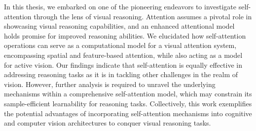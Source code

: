 In this thesis, we embarked on one of the pioneering endeavors to investigate self-attention through the lens of visual reasoning. Attention assumes a pivotal role in showcasing visual reasoning capabilities, and an enhanced attentional model holds promise for improved reasoning abilities. We elucidated how self-attention operations can serve as a computational model for a visual attention system, encompassing spatial and feature-based attention, while also acting as a model for active vision. Our findings indicate that self-attention is equally effective in addressing reasoning tasks as it is in tackling other challenges in the realm of vision. However, further analysis is required to unravel the underlying mechanisms within a comprehensive self-attention model, which may constrain its sample-efficient learnability for reasoning tasks. Collectively, this work exemplifies the potential advantages of incorporating self-attention mechanisms into cognitive and computer vision architectures to conquer visual reasoning tasks.